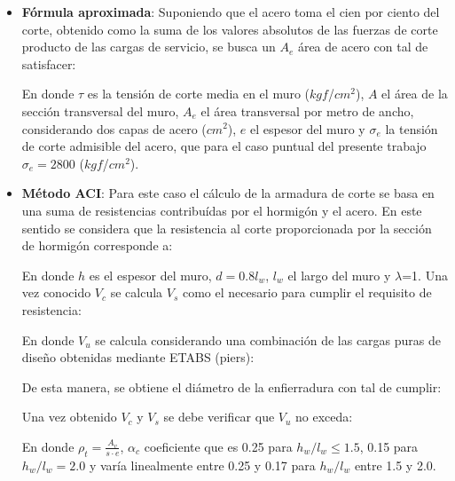 \begin{itemize}
    \item \textbf{Fórmula aproximada}: Suponiendo que el acero toma el cien por ciento del corte, obtenido como la suma de los valores absolutos de las fuerzas de corte producto de las cargas de servicio, se busca un $A_e$ área de acero con tal de satisfacer:
    
    
    En donde $\tau$ es la tensión de corte media en el muro ($kgf$/$cm^2$), $A$ el área de la sección transversal del muro, $A_e$ el área transversal por metro de ancho, considerando dos capas de acero ($cm^2$), $e$ el espesor del muro y $\sigma_e$ la tensión de corte admisible del acero, que para el caso puntual del presente trabajo $\sigma_e = 2800$ ($kgf$/$cm^2$).
    
    \item \textbf{Método ACI}: Para este caso el cálculo de la armadura de corte se basa en una suma de resistencias contribuídas por el hormigón y el acero. En este sentido se considera que la resistencia al corte proporcionada por la sección de hormigón corresponde a:
    
    
    En donde $h$ es el espesor del muro, $d=0.8l_w$, $l_w$ el largo del muro y $\lambda$=1. Una vez conocido $V_c$ se calcula $V_s$ como el necesario para cumplir el requisito de resistencia:
    
    
    En donde $V_u$ se calcula considerando una combinación de las cargas puras de diseño obtenidas mediante ETABS (piers):
    
    
    De esta manera, se obtiene el diámetro de la enfierradura con tal de cumplir:
    
    
    Una vez obtenido $V_c$ y $V_s$ se debe verificar que $V_u$ no exceda:
    
    
    En donde $\rho_t = \frac{A_v}{s\cdot e}$, $\alpha_c$ coeficiente que es 0.25 para $h_w/l_w \leq1.5$, 0.15 para $h_w/l_w = 2.0$ y varía linealmente entre 0.25 y 0.17 para $h_w/l_w$ entre 1.5 y 2.0.
\end{itemize}

